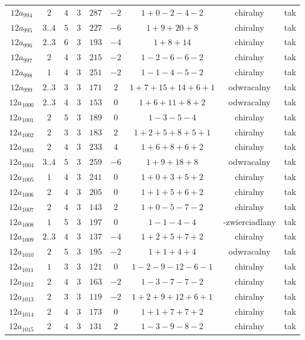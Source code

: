 \begin{longtable}{ccccccccc}
$12a_{994}$ & $2$ & $4$ & $3$ & $287$ & $-2$ & $1+0-2-4-2$ & chiralny & tak \\
$12a_{995}$ & $3..4$ & $5$ & $3$ & $227$ & $-6$ & $1+9+20+8$ & chiralny & tak \\
$12a_{996}$ & $2..3$ & $6$ & $3$ & $193$ & $-4$ & $1+8+14$ & chiralny & tak \\
$12a_{997}$ & $2$ & $4$ & $3$ & $215$ & $-2$ & $1-2-6-6-2$ & chiralny & tak \\
$12a_{998}$ & $1$ & $4$ & $3$ & $251$ & $-2$ & $1-1-4-5-2$ & chiralny & tak \\
$12a_{999}$ & $2..3$ & $3$ & $3$ & $171$ & $2$ & $1+7+15+14+6+1$ & odwracalny & tak \\
$12a_{1000}$ & $2..3$ & $4$ & $3$ & $153$ & $0$ & $1+6+11+8+2$ & odwracalny & tak \\
$12a_{1001}$ & $2$ & $5$ & $3$ & $189$ & $0$ & $1-3-5-4$ & chiralny & tak \\
$12a_{1002}$ & $2$ & $3$ & $3$ & $183$ & $2$ & $1+2+5+8+5+1$ & chiralny & tak \\
$12a_{1003}$ & $2$ & $4$ & $3$ & $233$ & $4$ & $1+6+8+6+2$ & chiralny & tak \\
$12a_{1004}$ & $3..4$ & $5$ & $3$ & $259$ & $-6$ & $1+9+18+8$ & odwracalny & tak \\
$12a_{1005}$ & $1$ & $4$ & $3$ & $241$ & $0$ & $1+0+3+5+2$ & chiralny & tak \\
$12a_{1006}$ & $2$ & $4$ & $3$ & $205$ & $0$ & $1+1+5+6+2$ & chiralny & tak \\
$12a_{1007}$ & $2$ & $4$ & $3$ & $143$ & $2$ & $1+0-5-7-2$ & chiralny & tak \\
$12a_{1008}$ & $1$ & $5$ & $3$ & $197$ & $0$ & $1-1-4-4$ & -zwierciadlany & tak \\
$12a_{1009}$ & $2..3$ & $4$ & $3$ & $137$ & $-4$ & $1+2+5+7+2$ & chiralny & tak \\
$12a_{1010}$ & $2$ & $5$ & $3$ & $195$ & $-2$ & $1+1+4+4$ & odwracalny & tak \\
$12a_{1011}$ & $1$ & $3$ & $3$ & $121$ & $0$ & $1-2-9-12-6-1$ & chiralny & tak \\
$12a_{1012}$ & $2$ & $4$ & $3$ & $163$ & $-2$ & $1-3-7-7-2$ & chiralny & tak \\
$12a_{1013}$ & $2$ & $3$ & $3$ & $119$ & $-2$ & $1+2+9+12+6+1$ & chiralny & tak \\
$12a_{1014}$ & $2$ & $4$ & $3$ & $173$ & $0$ & $1+1+7+7+2$ & chiralny & tak \\
$12a_{1015}$ & $2$ & $4$ & $3$ & $131$ & $2$ & $1-3-9-8-2$ & chiralny & tak \\

\end{longtable}
